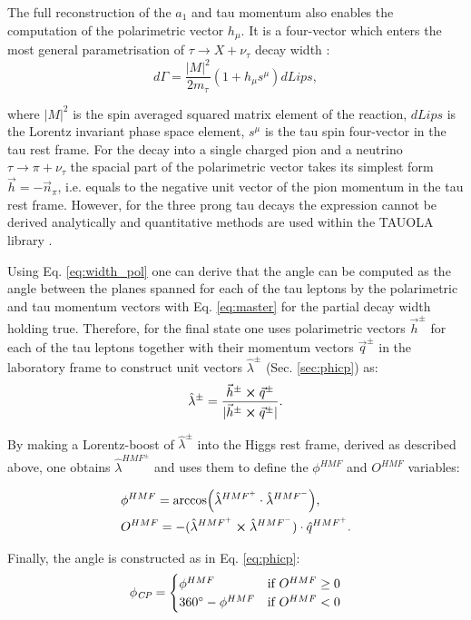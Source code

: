 The full reconstruction of the $a_1$ and tau momentum also enables the computation of the polarimetric vector $h_\mu$. It is a four-vector which enters the most general parametrisation of $\tau \to X + \nu_\tau$ decay width \cite{Davier:1992nw,Kuhn:1992nz}:
\begin{equation}\label{eq:width_pol}
    d\Gamma = \dfrac{|M|^2}{2m_\tau}(1+h_\mu s^\mu)dLips,
\end{equation}

where $|M|^2$ is the spin averaged squared matrix element of the reaction, $dLips$ is the Lorentz invariant phase space element, $s^\mu$ is the tau spin four-vector in the tau rest frame. For the decay into a single charged pion and a neutrino $\tau \to \pi + \nu_\tau$ the spacial part of the polarimetric vector takes its simplest form $\vec{h} = -\vec{n}_\pi$, i.e. equals to the negative unit vector of the pion momentum in the tau rest frame. However, for the three prong tau decays the expression cannot be derived analytically and quantitative methods are used within the TAUOLA library \cite{Jadach:1990mz,Jezabek:1991qp,Jadach:1993hs}.

Using Eq. \ref{eq:width_pol} one can derive that the \phicp angle can be computed as the angle between the planes spanned for each of the tau leptons by the polarimetric and tau momentum vectors with Eq. \ref{eq:master} for the partial decay width holding true. Therefore, for the \aaa final state one uses polarimetric vectors $\vec{h}^\pm$ for each of the tau leptons together with their momentum vectors $\vec{q}^\pm$ in the laboratory frame to construct unit vectors $\hat{\lambda}^{\pm}$ (Sec. \ref{sec:phicp}) as:
\begin{equation}
    \hat{\lambda}^\pm = \dfrac{\vec{h}^\pm \cross \vec{q}^\pm}{|\vec{h}^\pm \cross \vec{q}^\pm|}.
\end{equation}

By making a Lorentz-boost of $\hat{\lambda}^{\pm}$ into the Higgs rest frame, derived as described above, one obtains $\hat{\lambda}^{HMF^\pm}$ and uses them to define the $\phi^{HMF}$ and $O^{HMF}$ variables:

\begin{align}
    &\phi^{HMF} = \arccos(\hat{\lambda}^{HMF^+} \cdot \hat{\lambda}^{HMF^-}),\\
    &O^{HMF} = - (\hat{\lambda}^{HMF^+} \cross \hat{\lambda}^{HMF^-}) \cdot \hat{q}^{HMF^+}.
\end{align}

Finally, the \phicp angle is constructed as in Eq. \ref{eq:phicp}:
\begin{equation}
    \phi_{\textit{CP}} = 
    \begin{cases}
    \phi^{HMF} & \text{if} ~O^{HMF} \geq 0 \\
    360^\circ - \phi^{HMF} & \text{if} ~O^{HMF} < 0
    \end{cases}
\end{equation}

